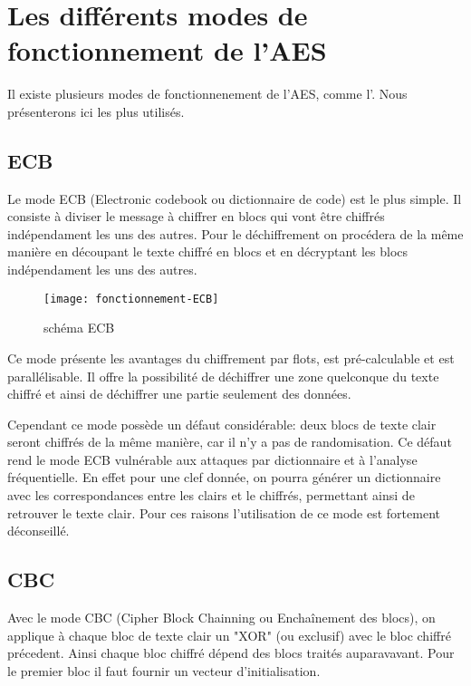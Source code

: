 \chapter{Les différents modes de fonctionnement de l'AES}
\label{chap:différents modes}

Il existe plusieurs modes de fonctionnenement de l'AES, comme l'\aes. Nous présenterons ici les plus utilisés.

\section{ECB}

Le mode ECB (Electronic codebook ou dictionnaire de code) est le plus simple. Il consiste à diviser le message à chiffrer en blocs qui vont être chiffrés indépendament les uns des autres. Pour le déchiffrement on procédera de la même manière en découpant le texte chiffré en blocs et en décryptant les blocs indépendament les uns des autres.

\begin{figure}[!h]
  \centering
  \texttt{[image: fonctionnement-ECB]}
  \caption{schéma ECB \cite{wiki}}
  \label{schema ECB}
\end{figure}

Ce mode présente les avantages du chiffrement par flots, est pré-calculable et est parallélisable. Il offre la possibilité de déchiffrer une zone quelconque du texte chiffré et ainsi de déchiffrer une partie seulement des données.

Cependant ce mode possède un défaut considérable: deux blocs de texte clair seront chiffrés de la même manière, car il n'y a pas de randomisation. Ce défaut rend le mode ECB vulnérable aux attaques par dictionnaire et à l'analyse fréquentielle. En effet pour une clef donnée, on pourra générer un dictionnaire avec les correspondances entre les clairs et le chiffrés, permettant ainsi de retrouver le texte clair. Pour ces raisons l'utilisation de ce mode est fortement déconseillé.

\section{CBC}

Avec le mode CBC (Cipher Block Chainning ou Enchaînement des blocs), on applique à chaque bloc de texte clair un "XOR" (ou exclusif) avec le bloc chiffré précedent. Ainsi chaque bloc chiffré dépend des blocs traités auparavavant. Pour le premier bloc il faut fournir un vecteur d'initialisation.

